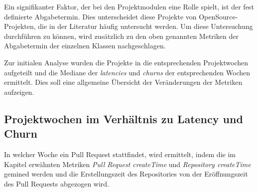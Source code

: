 Ein signifikanter Faktor, der bei den Projektmodulen eine Rolle spielt, ist der fest definierte Abgabetermin. Dies unterscheidet diese Projekte von OpenSource-Projekten, die in der Literatur häufig untersucht werden. Um diese Untersuchung durchführen zu können, wird zusätzlich zu den oben genannten Metriken der Abgabetermin der einzelnen Klassen nachgeschlagen.

Zur initialen Analyse wurden die Projekte in die entsprechenden Projektwochen aufgeteilt und die Mediane der \textit{latencies} und \textit{churns} der entsprechenden Wochen ermittelt. Dies soll eine allgemeine Übersicht der Veränderungen der Metriken aufzeigen.

\subsection{Projektwochen im Verhältnis zu Latency und Churn}
\label{sec:ProjektwochenLatencyChurn}
In welcher Woche ein Pull Request stattfindet, wird ermittelt, indem die im Kapitel  erwähnten Metriken \textit{Pull Request createTime} und \textit{Repository createTime} gemined werden und die Erstellungszeit des Repositories von der Eröffnungszeit des Pull Requests abgezogen wird. 


